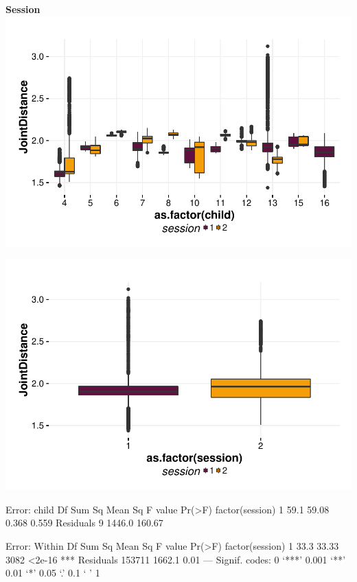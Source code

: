 \documentclass{article}
\begin{document}
\textbf{Session}
\includegraphics{features-plot_distance_child_session_quiz}

\includegraphics{features-plot_distance_session_quiz}

\begin{Schunk}
\begin{Soutput}
Error: child
                Df Sum Sq Mean Sq F value Pr(>F)
factor(session)  1   59.1   59.08   0.368  0.559
Residuals        9 1446.0  160.67               

Error: Within
                    Df Sum Sq Mean Sq F value Pr(>F)    
factor(session)      1   33.3   33.33    3082 <2e-16 ***
Residuals       153711 1662.1    0.01                   
---
Signif. codes:  0 ‘***’ 0.001 ‘**’ 0.01 ‘*’ 0.05 ‘.’ 0.1 ‘ ’ 1
\end{Soutput}
\end{Schunk}
\end{document}
